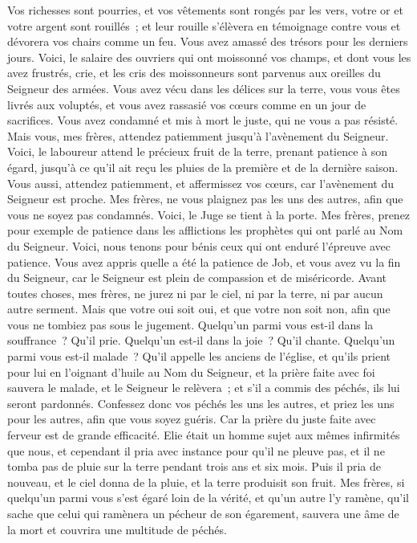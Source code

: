 \begin{multicols}{2}
Vos richesses sont pourries, et vos vêtements sont rongés par les vers,
votre or et votre argent sont rouillés~; et leur rouille s'élèvera en témoignage contre vous et dévorera vos chairs comme un feu. Vous avez amassé des trésors pour les derniers jours.
Voici, le salaire des ouvriers qui ont moissonné vos champs, et dont vous les avez frustrés, crie, et les cris des moissonneurs sont parvenus aux oreilles du Seigneur des armées.
Vous avez vécu dans les délices sur la terre, vous vous êtes livrés aux voluptés, et vous avez rassasié vos cœurs comme en un jour de sacrifices.
Vous avez condamné et mis à mort le juste, qui ne vous a pas résisté.
Mais vous, mes frères, attendez patiemment jusqu'à l'avènement du Seigneur. Voici, le laboureur attend le précieux fruit de la terre, prenant patience à son égard, jusqu'à ce qu'il ait reçu les pluies de la première et de la dernière saison.
Vous aussi, attendez patiemment, et affermissez vos cœurs, car l'avènement du Seigneur est proche.
Mes frères, ne vous plaignez pas les uns des autres, afin que vous ne soyez pas condamnés. Voici, le Juge se tient à la porte.
Mes frères, prenez pour exemple de patience dans les afflictions les prophètes qui ont parlé au Nom du Seigneur.
Voici, nous tenons pour bénis ceux qui ont enduré l'épreuve avec patience. Vous avez appris quelle a été la patience de Job, et vous avez vu la fin du Seigneur, car le Seigneur est plein de compassion et de miséricorde.
Avant toutes choses, mes frères, ne jurez ni par le ciel, ni par la terre, ni par aucun autre serment. Mais que votre oui soit oui, et que votre non soit non, afin que vous ne tombiez pas sous le jugement.
Quelqu'un parmi vous est-il dans la souffrance~? Qu'il prie. Quelqu'un est-il dans la joie~? Qu'il chante.
Quelqu'un parmi vous est-il malade~? Qu'il appelle les anciens de l'église, et qu'ils prient pour lui en l'oignant d'huile au Nom du Seigneur,
et la prière faite avec foi sauvera le malade, et le Seigneur le relèvera~; et s'il a commis des péchés, ils lui seront pardonnés.
Confessez donc vos péchés les uns les autres, et priez les uns pour les autres, afin que vous soyez guéris. Car la prière du juste faite avec ferveur est de grande efficacité.
Elie était un homme sujet aux mêmes infirmités que nous, et cependant il pria avec instance pour qu'il ne pleuve pas, et il ne tomba pas de pluie sur la terre pendant trois ans et six mois.
Puis il pria de nouveau, et le ciel donna de la pluie, et la terre produisit son fruit.
Mes frères, si quelqu'un parmi vous s'est égaré loin de la vérité, et qu'un autre l'y ramène,
qu'il sache que celui qui ramènera un pécheur de son égarement, sauvera une âme de la mort et couvrira une multitude de péchés.
\PPE{}
\end{multicols}
